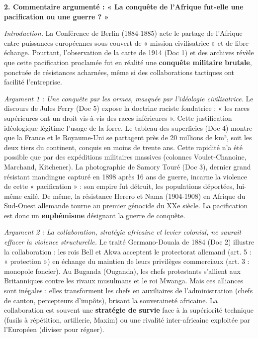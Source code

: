 \documentclass[11pt]{article}
\newcommand{\cle}[1]{{\popxbold\color{popdark}#1}}
\begin{document}
\begin{exoresolu}
\textbf{2. Commentaire argumenté : « La conquête de l'Afrique fut-elle une pacification ou une guerre ? »}

\textit{Introduction.} La Conférence de Berlin (1884-1885) acte le partage de l'Afrique entre puissances européennes sous couvert de « mission civilisatrice » et de libre-échange. Pourtant, l'observation de la carte de 1914 (Doc 1) et des archives révèle que cette \cle{pacification} proclamée fut en réalité une \textbf{conquête militaire brutale}, ponctuée de résistances acharnées, même si des collaborations tactiques ont facilité l'entreprise.

\textit{Argument 1 : Une conquête par les armes, masquée par l'idéologie civilisatrice.} Le discours de Jules Ferry (Doc 5) expose la doctrine raciste fondatrice : « les races supérieures ont un droit vis-à-vis des races inférieures ». Cette justification idéologique légitime l'usage de la force. Le tableau des superficies (Doc 4) montre que la France et le Royaume-Uni se partagent près de 20 millions de km², soit les deux tiers du continent, conquis en moins de trente ans. Cette rapidité n'a été possible que par des expéditions militaires massives (colonnes Voulet-Chanoine, Marchand, Kitchener). La photographie de Samory Touré (Doc 3), dernier grand résistant mandingue capturé en 1898 après 16 ans de guerre, incarne la violence de cette « pacification » : son empire fut détruit, les populations déportées, lui-même exilé. De même, la résistance Herero et Nama (1904-1908) en Afrique du Sud-Ouest allemande tourne au premier génocide du XXe siècle. La \cle{pacification} est donc un \textbf{euphémisme} désignant la guerre de conquête.

\textit{Argument 2 : La collaboration, stratégie africaine et levier colonial, ne saurait effacer la violence structurelle.} Le traité Germano-Douala de 1884 (Doc 2) illustre la \cle{collaboration} : les rois Bell et Akwa acceptent le protectorat allemand (art. 5 : « protection ») en échange du maintien de leurs privilèges commerciaux (art. 3 : monopole foncier). Au Buganda (Ouganda), les chefs protestants s'allient aux Britanniques contre les rivaux musulmans et le roi Mwanga. Mais ces alliances sont inégales : elles transforment les chefs en \cle{auxiliaires de l'administration} (chefs de canton, percepteurs d'impôts), brisant la souveraineté africaine. La collaboration est souvent une \textbf{stratégie de survie} face à la supériorité technique (fusils à répétition, artillerie, Maxim) ou une rivalité inter-africaine exploitée par l'Européen (diviser pour régner).


\end{exoresolu}
\end{document}
